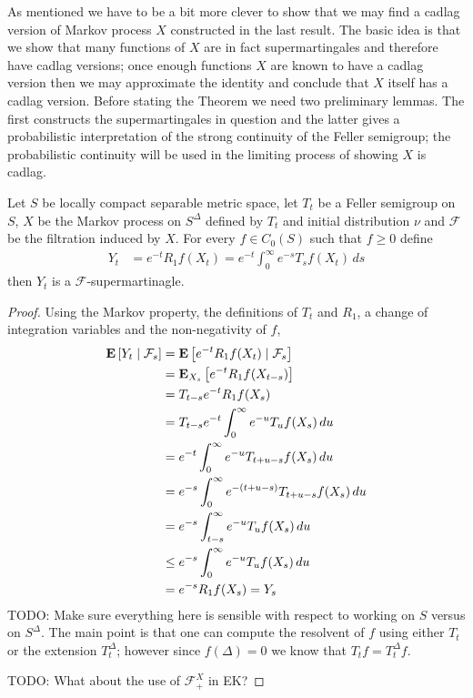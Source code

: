 As mentioned we have to be a bit more clever to show that we may find a cadlag version of Markov process $X$ constructed in the last result.  The basic idea is that we show that
many functions of $X$ are in fact supermartingales and therefore have cadlag versions; once enough functions $X$ are known to have
a cadlag version then we may approximate the identity and conclude that $X$ itself has a cadlag version.  Before stating the Theorem we need two preliminary lemmas.  The first constructs the supermartingales in question and the latter gives a probabilistic interpretation of the strong continuity of the Feller semigroup; the probabilistic continuity will
be used in the limiting process of showing $X$ is cadlag.

\begin{lem}\label{FellerResolventsAreSupermartingales}Let $S$ be locally compact separable metric space, let $T_t$ be a Feller semigroup on $S$, $X$ be the Markov process 
on $S^\Delta$ defined by $T_t$ and initial distribution $\nu$ and $\mathcal{F}$ be the filtration induced by $X$.  For every $f \in C_0(S)$ such that $f \geq 0$ define
\begin{align*}
Y_t &= e^{-t} R_1 f (X_t) = e^{-t} \int_0^\infty e^{-s} T_s f(X_t) \, ds
\end{align*}
then $Y_t$ is a $\mathcal{F}$-supermartinagle.
\end{lem}
\begin{proof}
Using the Markov property, the definitions of $T_t$ and $R_1$, a change of integration variables and the non-negativity of $f$,
\begin{align*}
\cexpectationlong{\mathcal{F}_{s}}{Y_t} 
&=\cexpectationlong{\mathcal{F}_{s}}{e^{-t} R_1 f(X_t)} \\
&=\sexpectation{e^{-t} R_1 f(X_{t-s})}{X_s} \\
&=T_{t-s} e^{-t} R_1 f(X_s) \\
&=T_{t-s} e^{-t} \int_0^\infty e^{-u} T_uf(X_s) \, du \\
&=e^{-t} \int_0^\infty e^{-u} T_{t+u-s} f(X_s) \, du \\
&=e^{-s} \int_0^\infty e^{-(t+u-s)} T_{t+u-s} f(X_s) \, du \\
&=e^{-s}\int_{t-s}^\infty e^{-u} T_{u} f(X_s) \, du \\
&\leq e^{-s} \int_{0}^\infty e^{-u} T_{u} f(X_s) \, du \\
&=e^{-s} R_1 f(X_s) = Y_s
\end{align*}
TODO:  Make sure everything here is sensible with respect to working on $S$ versus on $S^\Delta$.  The main point is that one can compute the resolvent of $f$ using either $T_t$ or the extension $T^\Delta_t$; however since $f(\Delta)=0$ we know that $T_t f = T^\Delta_t f$.

TODO: What about the use of $\mathcal{F}^X_+$ in EK?
\end{proof}

